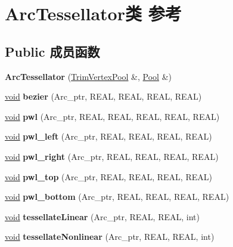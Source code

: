 \hypertarget{class_arc_tessellator}{}\section{Arc\+Tessellator类 参考}
\label{class_arc_tessellator}
\subsection*{Public 成员函数}
\begin{DoxyCompactItemize}
\item 
\mbox{\label{class_arc_tessellator_aa6e343eea056e2d82a58dc7f4b00df42}} 
{\bfseries Arc\+Tessellator} (\hyperlink{class_trim_vertex_pool}{Trim\+Vertex\+Pool} \&, \hyperlink{class_pool}{Pool} \&)
\item 
\mbox{\label{class_arc_tessellator_a5ebe310d9c2b19ff2fc98916470cf909}} 
\hyperlink{interfacevoid}{void} {\bfseries bezier} (Arc\+\_\+ptr, R\+E\+AL, R\+E\+AL, R\+E\+AL, R\+E\+AL)
\item 
\mbox{\label{class_arc_tessellator_ae344536cd2e7868000e371772cfbda92}} 
\hyperlink{interfacevoid}{void} {\bfseries pwl} (Arc\+\_\+ptr, R\+E\+AL, R\+E\+AL, R\+E\+AL, R\+E\+AL, R\+E\+AL)
\item 
\mbox{\label{class_arc_tessellator_aa1a4ba3716b7901887e44b788f420d65}} 
\hyperlink{interfacevoid}{void} {\bfseries pwl\+\_\+left} (Arc\+\_\+ptr, R\+E\+AL, R\+E\+AL, R\+E\+AL, R\+E\+AL)
\item 
\mbox{\label{class_arc_tessellator_a0be136c368c8608e1d7ad6b8719bb208}} 
\hyperlink{interfacevoid}{void} {\bfseries pwl\+\_\+right} (Arc\+\_\+ptr, R\+E\+AL, R\+E\+AL, R\+E\+AL, R\+E\+AL)
\item 
\mbox{\label{class_arc_tessellator_a0e6e260578843176ee3ac82d27df11d7}} 
\hyperlink{interfacevoid}{void} {\bfseries pwl\+\_\+top} (Arc\+\_\+ptr, R\+E\+AL, R\+E\+AL, R\+E\+AL, R\+E\+AL)
\item 
\mbox{\label{class_arc_tessellator_a46da960b6a1bd0f00ef8f5fc1b901f4e}} 
\hyperlink{interfacevoid}{void} {\bfseries pwl\+\_\+bottom} (Arc\+\_\+ptr, R\+E\+AL, R\+E\+AL, R\+E\+AL, R\+E\+AL)
\item 
\mbox{\label{class_arc_tessellator_ac5a4f7d8d6180b1a4253a612241b635d}} 
\hyperlink{interfacevoid}{void} {\bfseries tessellate\+Linear} (Arc\+\_\+ptr, R\+E\+AL, R\+E\+AL, int)
\item 
\mbox{\label{class_arc_tessellator_a76d2e7e31958d1a1066a494418e28f40}} 
\hyperlink{interfacevoid}{void} {\bfseries tessellate\+Nonlinear} (Arc\+\_\+ptr, R\+E\+AL, R\+E\+AL, int)
\end{DoxyCompactItemize}


